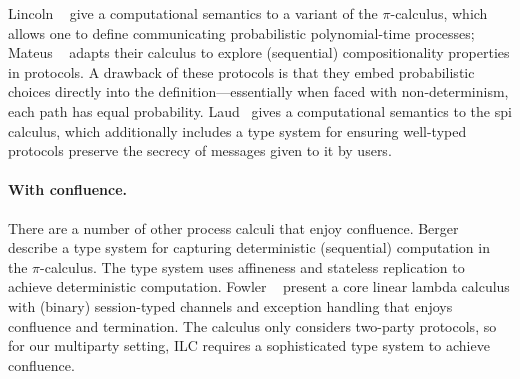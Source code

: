 
Lincoln \etal~\cite{lincoln1998probabilistic} give a computational semantics to
a variant of the $\pi$-calculus, which allows one to define communicating
probabilistic polynomial-time processes; Mateus
\etal~\cite{mateus2003composition} adapts their calculus to explore (sequential)
compositionality properties in protocols.
A drawback of these protocols is that they embed probabilistic choices directly
into the definition---essentially when faced with non-determinism, each path
has equal probability.
Laud~\cite{laud2005secrecy} gives a
computational semantics to the spi calculus, which additionally includes a type
system for ensuring well-typed protocols preserve the secrecy of messages given
to it by users.


\paragraph{With confluence.}
There are a number of other process calculi that enjoy confluence.  Berger
\etal~\cite{berger2001sequentiality} describe a type system for capturing
deterministic (sequential) computation in the $\pi$-calculus. The type system uses
affineness and stateless replication to achieve deterministic computation.
Fowler \etal~\cite{fowler2018session} present a core linear lambda calculus with
(binary) session-typed channels and exception handling that enjoys confluence
and termination.
The calculus only considers two-party protocols, so for our multiparty setting,
ILC requires a sophisticated type system to achieve confluence.

